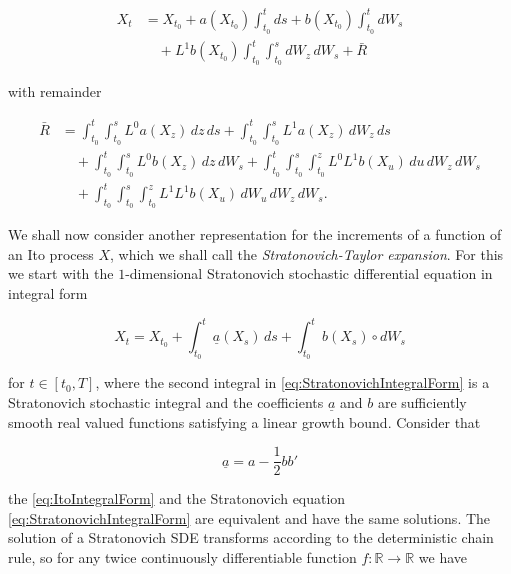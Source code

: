 \begin{equation} \label{eq:HigherOrderExpansion}
\begin{split}
    X_t &= X_{t_0} + a(X_{t_0}) \int_{t_0}^t ds + b(X_{t_0}) \int_{t_0}^t dW_s \\
    &\quad + L^1 b(X_{t_0}) \int_{t_0}^t \int_{t_0}^s dW_z \, dW_s + \bar{R}
\end{split}
\end{equation}

\noindent with remainder

\begin{equation} \label{eq:SecondRemainder}
\begin{split}
    \bar{R} &= \int_{t_0}^t \int_{t_0}^s L^0 a(X_z) \, dz \, ds + \int_{t_0}^t \int_{t_0}^s L^1 a(X_z) \, dW_z \, ds \\
    &\quad + \int_{t_0}^t \int_{t_0}^s L^0 b(X_z) \, dz \, dW_s + \int_{t_0}^t \int_{t_0}^s \int_{t_0}^z L^0 L^1 b(X_u) \, du \, dW_z \, dW_s \\
    &\quad + \int_{t_0}^t \int_{t_0}^s \int_{t_0}^z L^1 L^1 b(X_u) \, dW_u \, dW_z \, dW_s.
\end{split}
\end{equation}

\noindent We shall now consider another representation for the increments of a function of an Ito process \(X\), which we shall call the \textit{Stratonovich-Taylor expansion}. For this we start with the \(1\)-dimensional Stratonovich stochastic differential equation in integral form

\begin{equation} \label{eq:StratonovichIntegralForm}
    X_t = X_{t_0} + \int_{t_0}^t \underline{a}(X_s) \, ds + \int_{t_0}^t b(X_s) \circ dW_s
\end{equation}

\noindent for \(t \in [t_0, T]\), where the second integral in \eqref{eq:StratonovichIntegralForm} is a Stratonovich stochastic integral and the coefficients \(\underline{a}\) and \(b\) are sufficiently smooth real valued functions satisfying a linear growth bound. Consider that

\begin{equation*}
    \underline{a} = a - \frac{1}{2} bb'
\end{equation*}

\noindent the \cref{eq:ItoIntegralForm} and the Stratonovich equation \eqref{eq:StratonovichIntegralForm} are equivalent and have the same solutions. The solution of a Stratonovich SDE transforms according to the deterministic chain rule, so for any twice continuously differentiable function \(f : \mathbb{R} \to \mathbb{R}\) we have

